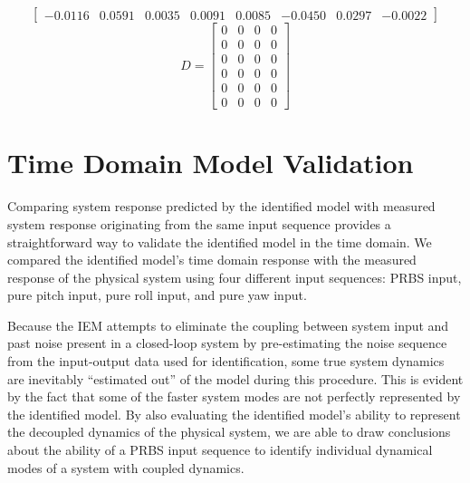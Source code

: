 \begin{table}[!htb]
{\begin{minipage}{5.5in}
\begin{equation*}
\begin{bmatrix}
-0.0116&0.0591&0.0035&0.0091&0.0085&-0.0450&0.0297&-0.0022
\end{bmatrix}
\end{equation*} 
\begin{equation*}
D = \begin{bmatrix}
0&0&0&0\\
0&0&0&0\\
0&0&0&0\\
0&0&0&0\\
0&0&0&0\\
0&0&0&0
\end{bmatrix}
\end{equation*}
\normalsize %
\end{minipage}}
\label{identified_system_matrices}
\end{table}









\newpage
\section{Time Domain Model Validation}
Comparing system response predicted by the identified model with measured system response originating from the same input sequence provides a straightforward way to validate the identified model in the time domain. We compared the identified model's time domain response with the measured response of the physical system using four different input sequences: PRBS input, pure pitch input, pure roll input, and pure yaw input. 

Because the IEM attempts to eliminate the coupling between system input and past noise present in a closed-loop system by pre-estimating the noise sequence from the input-output data used for identification, some true system dynamics are inevitably ``estimated out'' of the model during this procedure. This is evident by the fact that some of the faster system modes are not perfectly represented by the identified model. By also evaluating the identified model's ability to represent the decoupled dynamics of the physical system, we are able to draw conclusions about the ability of a PRBS input sequence to identify individual dynamical modes of a system with coupled dynamics. 

